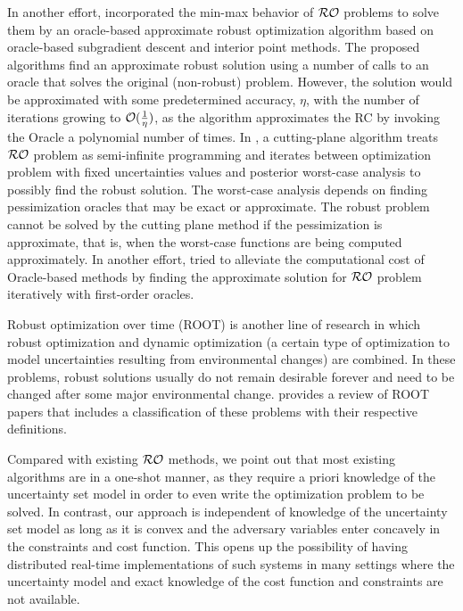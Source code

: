 \documentclass[journal,twoside,web]{ieeecolor}
\begin{document}
In another effort, \cite{bental2015} incorporated the min-max behavior of ${\cal RO}$ problems to solve them by an oracle-based approximate robust optimization algorithm based on oracle-based subgradient descent and interior point methods. The proposed algorithms find an approximate robust solution using a number of calls to an oracle that solves the original (non-robust) problem. However, the solution would be approximated with some predetermined accuracy, $\eta$, with the number of iterations growing to ${\cal O}(\frac{1}{\eta})$, as the algorithm approximates the RC by invoking the Oracle a polynomial number of times.
In \cite{mutapcic2009}, a cutting-plane algorithm treats ${\cal RO}$ problem as semi-infinite programming and iterates between optimization problem with fixed uncertainties values and posterior worst-case analysis to possibly find the robust solution.
The worst-case analysis depends on finding pessimization oracles that may be exact or approximate. The robust problem cannot be solved by the cutting plane method if the pessimization is approximate, that is, when the worst-case functions are being computed approximately. In another effort, \cite{nguyen2018} tried to alleviate the computational cost of Oracle-based methods by finding the approximate solution for ${\cal RO}$ problem iteratively with first-order oracles.

Robust optimization over time (ROOT) is another line of research in which robust optimization and dynamic optimization (a certain type of optimization to model uncertainties resulting from environmental changes) are combined. In these problems, robust solutions usually do not remain desirable forever and need to be changed after some major environmental change. \cite{yazdani2023} provides a review of ROOT papers that includes a classification of these problems with their respective definitions.

Compared with existing ${\cal RO}$ methods, we point out that most existing algorithms are in a one-shot manner, as they require a priori knowledge of the uncertainty set model in order to even write the optimization problem to be solved. In contrast, our approach is independent of knowledge of the uncertainty set model as long as it is convex and the adversary variables enter concavely in the constraints and cost function. This opens up the possibility of having distributed real-time implementations of such systems in many settings where the uncertainty model and exact knowledge of the cost function and constraints are not available.
\end{document}
